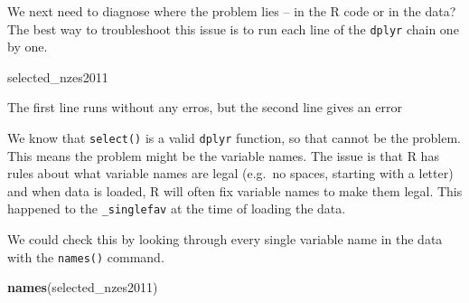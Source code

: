 \documentclass[]{article}
\newenvironment{Shaded}{\begin{snugshade}}{\end{snugshade}}
\newcommand{\KeywordTok}[1]{\textcolor[rgb]{0.13,0.29,0.53}{\textbf{#1}}}
\newcommand{\StringTok}[1]{\textcolor[rgb]{0.31,0.60,0.02}{#1}}
\newcommand{\OperatorTok}[1]{\textcolor[rgb]{0.81,0.36,0.00}{\textbf{#1}}}
\newcommand{\NormalTok}[1]{#1}
\begin{document}
We next need to diagnose where the problem lies -- in the R code or in
the data? The best way to troubleshoot this issue is to run each line of
the \texttt{dplyr} chain one by one.

\begin{Shaded}
\begin{Highlighting}[]
\NormalTok{selected_nzes2011 }
\end{Highlighting}
\end{Shaded}

The first line runs without any erros, but the second line gives an
error

\begin{Shaded}
\end{Shaded}

We know that \texttt{select()} is a valid \texttt{dplyr} function, so
that cannot be the problem. This means the problem might be the variable
names. The issue is that R has rules about what variable names are legal
(e.g.~no spaces, starting with a letter) and when data is loaded, R will
often fix variable names to make them legal. This happened to the
\texttt{\_singlefav} at the time of loading the data.

We could check this by looking through every single variable name in the
data with the \texttt{names()} command.

\begin{Shaded}
\begin{Highlighting}[]
\KeywordTok{names}\NormalTok{(selected_nzes2011)}
\end{Highlighting}
\end{Shaded}
\end{document}
